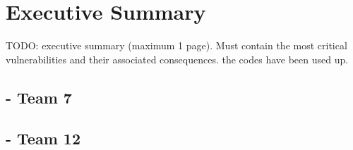 \chapter{Executive Summary}

TODO:\newline
executive summary (maximum 1 page). Must contain the most critical
vulnerabilities and their associated consequences. the codes have been used up.\newline

\section{\bs - Team 7}

\section{\gnb - Team 12}
